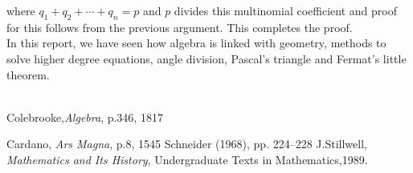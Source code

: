 \documentclass[a4paper,reqno,11pt]{amsart}
\theoremstyle{plain}%
\theoremstyle{definition}
\theoremstyle{remark}
\begin{document}
where $q_{1}+q_{2}+\cdots+q_{n} = p$ and $p$ divides this multinomial coefficient and proof for this follows from the previous argument. This completes the proof.\\
\indent In this report, we have seen how algebra is linked with geometry, methods to solve higher degree equations, angle division, Pascal's triangle and Fermat's little theorem. \\
\\
\begin{thebibliography}{99}
		
		 Colebrooke,\textit{Algebra}, p.346, 1817
		
		 Cardano, \textit{Ars Magna}, p.8, 1545
   Schneider (1968), pp. 224–228
   J.Stillwell, \textit{Mathematics and Its History}, Undergraduate Texts in Mathematics,1989.
 
		

		
		
	\end{thebibliography}
	






 
\end{document}
